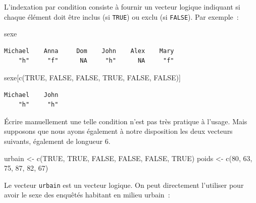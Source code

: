 \documentclass[
  letterpaper,
  DIV=11,
  numbers=noendperiod,
  oneside]{scrreprt}
\newenvironment{Shaded}{\begin{snugshade}}{\end{snugshade}}
\newcommand{\ConstantTok}[1]{\textcolor[rgb]{0.56,0.35,0.01}{#1}}
\newcommand{\DecValTok}[1]{\textcolor[rgb]{0.68,0.00,0.00}{#1}}
\newcommand{\FunctionTok}[1]{\textcolor[rgb]{0.28,0.35,0.67}{#1}}
\newcommand{\NormalTok}[1]{\textcolor[rgb]{0.00,0.23,0.31}{#1}}
\newcommand{\OtherTok}[1]{\textcolor[rgb]{0.00,0.23,0.31}{#1}}
\begin{document}
L'indexation par condition consiste à fournir un vecteur logique
indiquant si chaque élément doit être inclus (si \texttt{TRUE}) ou exclu
(si \texttt{FALSE}). Par exemple~:

\begin{Shaded}
\begin{Highlighting}[]
\NormalTok{sexe}
\end{Highlighting}
\end{Shaded}

\begin{verbatim}
Michael    Anna     Dom    John    Alex    Mary 
    "h"     "f"      NA     "h"      NA     "f" 
\end{verbatim}

\begin{Shaded}
\begin{Highlighting}[]
\NormalTok{sexe[}\FunctionTok{c}\NormalTok{(}\ConstantTok{TRUE}\NormalTok{, }\ConstantTok{FALSE}\NormalTok{, }\ConstantTok{FALSE}\NormalTok{, }\ConstantTok{TRUE}\NormalTok{, }\ConstantTok{FALSE}\NormalTok{, }\ConstantTok{FALSE}\NormalTok{)]}
\end{Highlighting}
\end{Shaded}

\begin{verbatim}
Michael    John 
    "h"     "h" 
\end{verbatim}

Écrire manuellement une telle condition n'est pas très pratique à
l'usage. Mais supposons que nous ayons également à notre disposition les
deux vecteurs suivants, également de longueur 6.

\begin{Shaded}
\begin{Highlighting}[]
\NormalTok{urbain }\OtherTok{\textless{}{-}} \FunctionTok{c}\NormalTok{(}\ConstantTok{TRUE}\NormalTok{, }\ConstantTok{TRUE}\NormalTok{, }\ConstantTok{FALSE}\NormalTok{, }\ConstantTok{FALSE}\NormalTok{, }\ConstantTok{FALSE}\NormalTok{, }\ConstantTok{TRUE}\NormalTok{)}
\NormalTok{poids }\OtherTok{\textless{}{-}} \FunctionTok{c}\NormalTok{(}\DecValTok{80}\NormalTok{, }\DecValTok{63}\NormalTok{, }\DecValTok{75}\NormalTok{, }\DecValTok{87}\NormalTok{, }\DecValTok{82}\NormalTok{, }\DecValTok{67}\NormalTok{)}
\end{Highlighting}
\end{Shaded}

Le vecteur \texttt{urbain} est un vecteur logique. On peut directement
l'utiliser pour avoir le sexe des enquêtés habitant en milieu urbain~:
\end{document}
